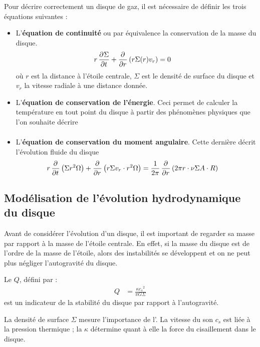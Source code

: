Pour décrire correctement un disque de gaz, il est nécessaire de définir les trois équations suivantes : 
\begin{itemize}
\item L'\textbf{équation de continuité} ou par équivalence la conservation de la masse du disque.
\begin{align}
r\mathinner{ \dfrac{\partial{^{}}\Sigma}{\partial{{t}^{}}} } + \mathinner{ \dfrac{\partial{^{}}}{\partial{{r}^{}}} }\left(r\Sigma(r)v_r\right) &= 0\label{eq:disk_continuite}
\end{align}
où $r$ est la distance à l'étoile centrale, $\Sigma$ est le densité de surface du disque et $v_r$ la vitesse radiale à une distance donnée.
\item L'\textbf{équation de conservation de l'énergie}. Ceci permet de calculer la température en tout point du disque à partir des phénomènes physiques que l'on souhaite décrire
\begin{align}
\label{eq:disk_energy}
\end{align}
\item L'\textbf{équation de conservation du moment angulaire}. Cette dernière décrit l'évolution fluide du disque
\begin{align}
r\mathinner{ \dfrac{\partial{^{}}}{\partial{{t}^{}}} }\left(\Sigma r^2 \Omega\right) + \mathinner{ \dfrac{\partial{^{}}}{\partial{{r}^{}}} }\left(r \Sigma v_r \cdot r^2 \Omega\right) &= \frac{1}{2\pi} \mathinner{ \dfrac{\partial{^{}}}{\partial{{r}^{}}} } \left(2\pi r \cdot \nu \Sigma A \cdot R\right)\label{eq:disk_angular_momentum}
\end{align}
\end{itemize}

\subsection{Modélisation de l'évolution hydrodynamique du disque}
Avant de considérer l'évolution d'un disque, il est important de regarder sa masse par rapport à la masse de l'étoile centrale. En effet, si la masse du disque est de l'ordre de la masse de l'étoile, alors des instabilités se développent et on ne peut plus négliger l'autogravité du disque. 

Le  $Q$, défini par :
\begin{align}
Q &= \frac{\kappa {c_{s}}^2}{\pi G \Sigma}
\end{align}
est un indicateur de la stabilité du disque par rapport à l'autogravité.

La densité de surface $\Sigma$\index{$\Sigma$} mesure l'importance de l'. La vitesse du son $c_{s}$ est liée à la pression thermique ; la  $\kappa$ détermine quant à elle la force du cisaillement dans le disque.

